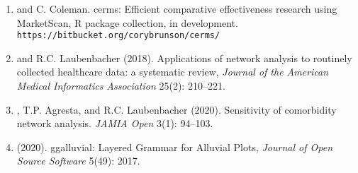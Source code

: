 \documentclass{nihbiosketch}
\begin{document}
\begin{enumerate}
\begin{enumerate}
\item {} and C. Coleman. cerms: Efficient comparative effectiveness research using MarketScan, R package collection, in development. \nolinkurl{https://bitbucket.org/corybrunson/cerms/}
\item {} and R.C. Laubenbacher (2018). Applications of network analysis to routinely collected healthcare data: a systematic review, \emph{Journal of the American Medical Informatics Association} 25(2): 210--221.
\item {}, T.P. Agresta, and R.C. Laubenbacher (2020). Sensitivity of comorbidity network analysis. \emph{JAMIA Open} 3(1): 94--103.
\item {} (2020). ggalluvial: Layered Grammar for Alluvial Plots, \emph{Journal of Open Source Software} 5(49): 2017.
\end{enumerate}



\end{enumerate}
\end{document}
